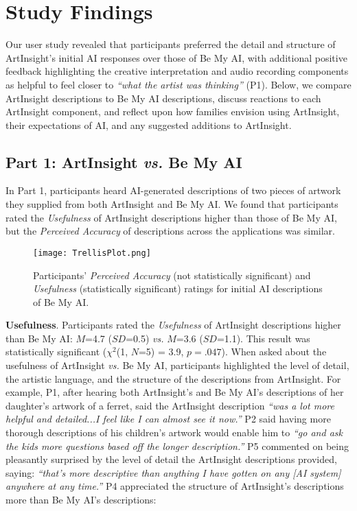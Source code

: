 \documentclass[sigconf]{acmart}
\begin{document}
\section{Study Findings}
Our user study revealed that participants preferred the detail and structure of ArtInsight’s initial AI responses over those of Be My AI, with additional positive feedback highlighting the creative interpretation and audio recording components as helpful to feel closer to \textit{``what the artist was thinking''} (P1). Below, we compare ArtInsight descriptions to Be My AI descriptions, discuss reactions to each ArtInsight component, and reflect upon how families envision using ArtInsight, their expectations of AI, and any suggested additions to ArtInsight.

\subsection{Part 1: ArtInsight \textit{vs.} Be My AI}
In Part 1, participants heard AI-generated descriptions of two pieces of artwork they supplied from both ArtInsight and Be My AI. We found that participants rated the \textit{Usefulness} of ArtInsight descriptions higher than those of Be My AI, but the \textit{Perceived Accuracy} of descriptions across the applications was similar.

\begin{figure*}[h]
\centering
\texttt{[image: TrellisPlot.png]}
\caption{Participants' \textit{Perceived Accuracy} (not statistically significant) and \textit{Usefulness} (statistically significant) ratings for initial AI descriptions of Be My AI.}
\label{Usefulness}
\vspace{-1em}
\end{figure*}

\textbf{Usefulness}. Participants rated the \textit{Usefulness} of ArtInsight descriptions higher than Be My AI: $M$=4.7 ($SD$=0.5) \textit{vs.} $M$=3.6 ($SD$=1.1). This result was statistically significant ($\chi^2$(1, $N$=5) = 3.9, $p=.047$). When asked about the usefulness of ArtInsight \textit{vs.} Be My AI, participants highlighted the level of detail, the artistic language, and the structure of the descriptions from ArtInsight. For example, P1, after hearing both ArtInsight's and Be My AI's descriptions of her daughter's artwork of a ferret, said the ArtInsight description \textit{``was a lot more helpful and detailed...I feel like I can almost see it now.''} P2 said having more thorough descriptions of his children's artwork would enable him to \textit{``go and ask the kids more questions based off the longer description.''} P5 commented on being pleasantly surprised by the level of detail the ArtInsight descriptions provided, saying: \textit{``that's more descriptive than anything I have gotten on any [AI system] anywhere at any time.''} P4 appreciated the structure of ArtInsight's descriptions more than Be My AI's descriptions: 
\end{document}
